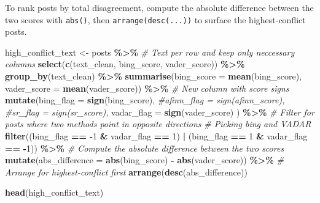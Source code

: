 \documentclass[
]{article}
\newenvironment{Shaded}{\begin{snugshade}}{\end{snugshade}}
\newcommand{\AttributeTok}[1]{\textcolor[rgb]{0.13,0.29,0.53}{#1}}
\newcommand{\CommentTok}[1]{\textcolor[rgb]{0.56,0.35,0.01}{\textit{#1}}}
\newcommand{\DecValTok}[1]{\textcolor[rgb]{0.00,0.00,0.81}{#1}}
\newcommand{\FunctionTok}[1]{\textcolor[rgb]{0.13,0.29,0.53}{\textbf{#1}}}
\newcommand{\NormalTok}[1]{#1}
\newcommand{\OtherTok}[1]{\textcolor[rgb]{0.56,0.35,0.01}{#1}}
\newcommand{\SpecialCharTok}[1]{\textcolor[rgb]{0.81,0.36,0.00}{\textbf{#1}}}
\begin{document}
To rank posts by total disagreement, compute the absolute difference
between the two scores with \texttt{abs()}, then
\texttt{arrange(desc(...))} to surface the highest-conflict posts.

\begin{Shaded}
\begin{Highlighting}[]
\NormalTok{high\_conflict\_text }\OtherTok{\textless{}{-}}\NormalTok{ posts }\SpecialCharTok{\%\textgreater{}\%} 
  \CommentTok{\# Text per row and keep only neccessary columns  }
  \FunctionTok{select}\NormalTok{(}\FunctionTok{c}\NormalTok{(text\_clean, bing\_score, vader\_score)) }\SpecialCharTok{\%\textgreater{}\%} 
  \FunctionTok{group\_by}\NormalTok{(text\_clean) }\SpecialCharTok{\%\textgreater{}\%} 
  \FunctionTok{summarise}\NormalTok{(}\AttributeTok{bing\_score =} \FunctionTok{mean}\NormalTok{(bing\_score), }
            \AttributeTok{vader\_score =} \FunctionTok{mean}\NormalTok{(vader\_score)) }\SpecialCharTok{\%\textgreater{}\%} 
  \CommentTok{\# New column with score signs }
  \FunctionTok{mutate}\NormalTok{(}\AttributeTok{bing\_flag =} \FunctionTok{sign}\NormalTok{(bing\_score),}
         \CommentTok{\#afinn\_flag = sign(afinn\_score),}
         \CommentTok{\#sr\_flag = sign(sr\_score),}
         \AttributeTok{vadar\_flag =} \FunctionTok{sign}\NormalTok{(vader\_score)}
\NormalTok{         ) }\SpecialCharTok{\%\textgreater{}\%} 
  \CommentTok{\# Filter for posts where two methods point in opposite directions }
  \CommentTok{\# Picking bing and VADAR }
  \FunctionTok{filter}\NormalTok{((bing\_flag }\SpecialCharTok{==} \SpecialCharTok{{-}}\DecValTok{1} \SpecialCharTok{\&}\NormalTok{ vadar\_flag }\SpecialCharTok{==} \DecValTok{1}\NormalTok{) }\SpecialCharTok{|} 
\NormalTok{         (bing\_flag }\SpecialCharTok{==} \DecValTok{1} \SpecialCharTok{\&}\NormalTok{ vadar\_flag }\SpecialCharTok{==} \SpecialCharTok{{-}}\DecValTok{1}\NormalTok{)) }\SpecialCharTok{\%\textgreater{}\%} 
  \CommentTok{\# Compute the absolute difference between the two scores }
  \FunctionTok{mutate}\NormalTok{(}\AttributeTok{abs\_difference =} \FunctionTok{abs}\NormalTok{(bing\_score) }\SpecialCharTok{{-}} \FunctionTok{abs}\NormalTok{(vader\_score)) }\SpecialCharTok{\%\textgreater{}\%} 
  \CommentTok{\# Arrange for highest{-}conflict first }
  \FunctionTok{arrange}\NormalTok{(}\FunctionTok{desc}\NormalTok{(abs\_difference))}

\FunctionTok{head}\NormalTok{(high\_conflict\_text)}
\end{Highlighting}
\end{Shaded}
\end{document}
